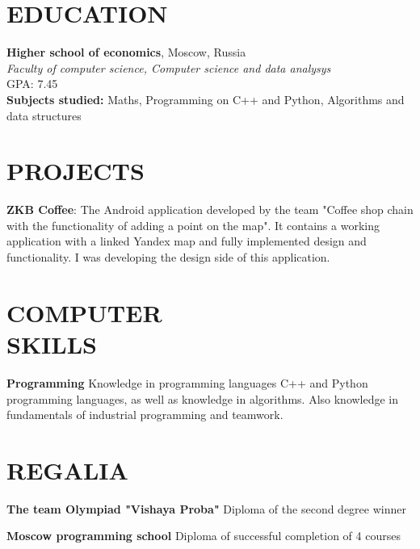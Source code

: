 \documentclass[margin]{res}
\begin{document}

\address{Moscow, Russia\\ \textit{\href{https://ru.linkedin.com/in/ivan-latyshev-a8875630a}{Linkedin}}}

\address{ivanlatysev2896@gmail.com\\+7(968)-958-07-86}

\begin{resume}

\section{EDUCATION}
\textbf{Higher school of economics}, Moscow, Russia\\
{\sl Faculty of computer science, Computer science and data analysys}\\
{\hfill GPA: 
7.45\\}
\textbf{Subjects studied: } Maths, Programming on C++ and Python, Algorithms and data structures\\

\section{PROJECTS}
\par
\textbf{ZKB Coffee}: 
The Android application developed by the team "Coffee shop chain with the functionality of adding a point on the map". It contains a working application with a linked Yandex map and fully implemented design and functionality. I was developing the design side of this application.
\\

\section{COMPUTER\\SKILLS}

\textbf{Programming} 
Knowledge in programming languages C++ and Python programming languages, as well as knowledge in algorithms. Also knowledge in fundamentals of industrial programming and teamwork. 

\section{REGALIA}

\textbf{The team Olympiad "Vishaya Proba"}
Diploma of the second degree winner

\textbf{Moscow programming school}
Diploma of successful completion of 4 courses


\end{resume}
\end{document}
